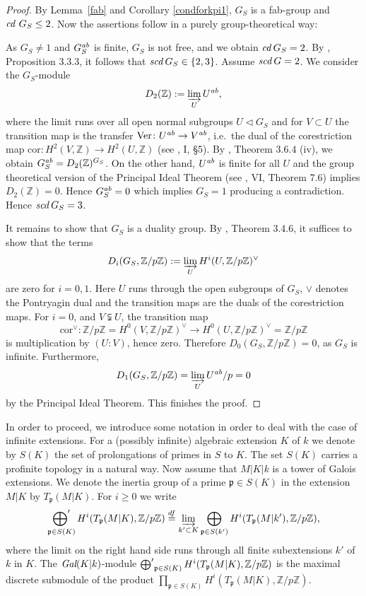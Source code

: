 \documentclass[10pt]{article}
\newcommand{\Z}{{\mathbb Z}}
\newcommand{\ab}{\text{\it ab}}
\newcommand{\cd}{\text{\it cd}\:}
\newcommand{\scd}{\text{\it scd}\:}
\newcommand{\Gal}{\text{\it Gal}}
\newcommand{\ressum}{\mathop{\hbox{${\displaystyle\bigoplus}'$}}\limits}
\newcommand{\ressumsmall}{\mathop{\hbox{${\bigoplus}'$}}}
\theoremstyle{alex}
\theoremstyle{alexdef}
\begin{document}
\begin{proof}
By Lemma~\ref{fab} and Corollary \ref{condforkpi1}, $G_S$ is a fab-group and $\cd\,G_S\leq 2$. Now the assertions follow in a purely group-theoretical way:

As $G_S\neq 1$ and $G_S^{\ab}$ is finite, $G_S$ is not free, and we obtain $\cd G_S=2$. By \cite{NSW}, Proposition 3.3.3, it follows that $\scd G_S \in \{2,3\}$. Assume  $\scd G=2$. We consider the $G_S$-module
\[
D_2(\Z):=\varinjlim_{U} U^{\ab},
\]
where the limit runs over all open normal subgroups $U\lhd G_S$ and for $V \subset U$ the transition map is the transfer $\text{Ver}\colon U^{\ab} \to V^{\ab}$, i.e.\ the dual of the corestriction map $\text{cor}\colon H^2(V,\Z) \to H^2(U,\Z)$ (see \cite{NSW}, I, \S5).
By \cite{NSW}, Theorem 3.6.4 (iv), we obtain $G_S^{\ab}=D_2(\Z)^{G_S}$. On the other hand, $U^{\ab}$ is finite for all $U$ and the group theoretical version of the Principal Ideal Theorem (see \cite{Ne}, VI, Theorem 7.6) implies $D_2(\Z)=0$. Hence $G_S^{\ab}=0$ which implies $G_S=1$ producing a contradiction. Hence $\scd G_S=3$.

It remains to show that $G_S$ is a duality group. By \cite{NSW}, Theorem 3.4.6, it suffices to show that the terms
\[
D_i(G_S,\Z/p\Z):= \varinjlim_{U} H^i(U,\Z/p\Z)^\vee
\]
are zero for $i=0,1$. Here $U$ runs through the open subgroups of $G_S$, $\scriptstyle \vee$ denotes the Pontryagin dual and the transition maps are the duals of the corestriction maps. For $i=0$, and $V\subsetneqq U$, the transition map
\[
\text{cor}^\vee\colon \Z/p\Z=H^0(V,\Z/p\Z)^\vee \to H^0(U,\Z/p\Z)^\vee=\Z/p\Z
\]
is multiplication by $(U:V)$, hence zero. Therefore $D_0(G_S,\Z/p\Z)=0$, as $G_S$ is infinite. Furthermore,
\[
D_1(G_S,\Z/p\Z)=\varinjlim_U U^{\ab}/p=0
\]
by the Principal Ideal Theorem. This finishes the proof.
\end{proof}



In order to proceed, we introduce some notation in order to deal with the case of infinite extensions.  For a (possibly infinite) algebraic extension $K$ of $k$ we denote by $S(K)$ the set of prolongations of primes in $S$ to $K$. The set $S(K)$ carries a profinite topology in a natural way. Now assume that $M|K|k$ is a tower of Galois extensions.  We denote the inertia group of a prime ${\mathfrak p}\in S(K)$ in the extension $M|K$ by $T_{\mathfrak p}(M|K)$. For $i\geq 0$ we write
\[
\ressum_{{\mathfrak p} \in S(K)} H^i(T_{\mathfrak p}(M|K), \Z/p\Z)
\stackrel{df}{=}
\varinjlim_{k'\subset K} \bigoplus_{{\mathfrak p} \in S(k')} H^i(T_{\mathfrak p}(M|k'), \Z/p\Z),
\]
where the limit on the right hand side runs through all finite subextensions $k'$ of $k$ in $K$. The $\Gal(K|k)$-module $\ressumsmall_{{\mathfrak p} \in S(K)} H^i(T_{\mathfrak p}(M|K), \Z/p\Z)$ is the maximal discrete submodule of the  product $\prod_{{\mathfrak p} \in S(K)} H^i(T_{\mathfrak p}(M|K), \Z/p\Z) $.
\end{document}
